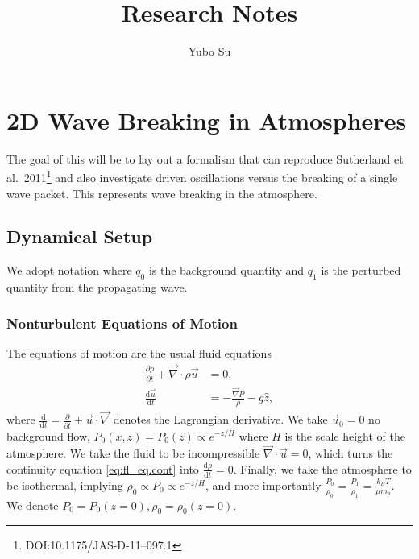 \documentclass[11pt,
        usenames, %
        dvipsnames %
    ]{report}
\newcommand*{\rd}[2]{\frac{\mathrm{d}#1}{\mathrm{d}#2}}
\newcommand*{\pd}[2]{\frac{\partial#1}{\partial#2}}
\begin{document}
\def\Snospace~{\S{}} %
\renewcommand*{\sectionautorefname}{\Snospace}
\renewcommand*{\appendixautorefname}{\Snospace}
\renewcommand*{\figureautorefname}{Fig.}
\renewcommand*{\equationautorefname}{Eq.}
\renewcommand*{\tableautorefname}{Tab.}

\onehalfspacing

\pagestyle{fancy}
\cfoot{\thepage/\pageref{LastPage}}

\title{Research Notes}
\author{Yubo Su}

\maketitle

\tableofcontents

\newpage

\chapter{2D Wave Breaking in Atmospheres}

The goal of this will be to lay out a formalism that can reproduce Sutherland et
al.~2011\footnote{DOI:10.1175/JAS-D-11--097.1} and also investigate driven
oscillations versus the breaking of a single wave packet. This represents wave
breaking in the atmosphere.

\section{Dynamical Setup}

We adopt notation where $q_0$ is the background quantity and $q_1$ is the
perturbed quantity from the propagating wave.

\subsection{Nonturbulent Equations of Motion}

The equations of motion are the usual fluid equations
\begin{subequations}\label{se:fl_eq}
    \begin{align}
        \pd{\rho}{t} + \vec{\nabla} \cdot \rho \vec{u} &= 0,
            \label{eq:fl_eq.cont}\\
        \rd{\vec{u}}{t} &= -\frac{\vec{\nabla}P}{\rho} - g\hat{z},
            \label{eq:fl_eq.mom}
    \end{align}
\end{subequations}
where $\rd{}{t} = \pd{}{t} + \vec{u} \cdot \vec{\nabla}$ denotes the Lagrangian
derivative. We take $\vec{u}_0 = 0$ no background flow, $P_0(x, z) = P_0(z)
\propto e^{-z/H}$ where $H$ is the scale height of the atmosphere. We take the
fluid to be incompressible $\vec{\nabla} \cdot \vec{u} = 0$, which turns the
continuity equation \autoref{eq:fl_eq.cont} into $\rd{\rho}{t} = 0$. Finally, we
take the atmosphere to be isothermal, implying $\rho_0 \propto P_0 \propto
e^{-z/H}$, and more importantly $\frac{P_0}{\rho_0} = \frac{P_1}{\rho_1} =
\frac{k_BT}{\mu m_p}$. We denote $P_0 = P_0(z=0), \rho_0 = \rho_0(z=0)$.
\end{document}
